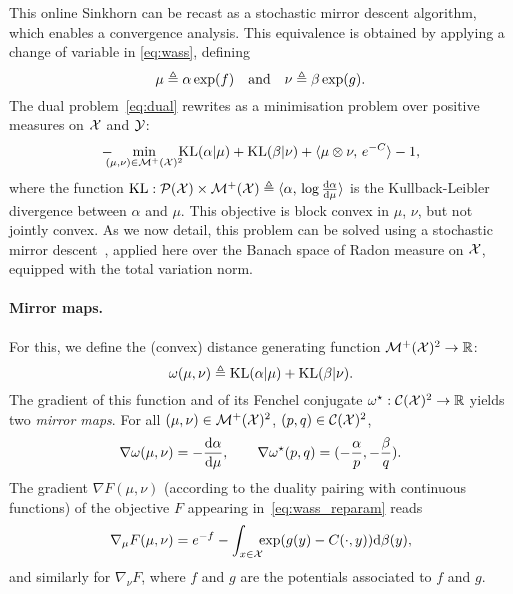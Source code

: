 This online Sinkhorn can be recast as a stochastic mirror descent algorithm, which enables a convergence analysis.
%
This equivalence is obtained by applying a change
of variable in \eqref{eq:wass}, defining 
\begin{equation}\label{eq-change-var}
	\mu \triangleq \alpha \exp(f)
	\quad \text{and} \quad 
	\nu \triangleq \beta \exp(g). 
\end{equation}
The dual problem~\eqref{eq:dual} 
rewrites as a minimisation problem over positive measures on $\mathcal{X}$ and $\mathcal{Y}$:
\begin{equation}\label{eq:wass_reparam}
    - \!\!\!\!\min_{(\mu,\nu) \in \mathcal{M}^+(\mathcal{X})^2} \!\!\!\textrm{KL}(\alpha | \mu)
    + \textrm{KL}(\beta | \nu) + \langle \mu \otimes \nu,\,e^{-C}\rangle - 1,
\end{equation}
where the function $\textrm{KL}: \mathcal{P}(\mathcal{X}) \times \mathcal{M}^+(\mathcal{X}) \triangleq \langle \alpha,\, \log \frac{\textrm{d} \alpha}{\textrm{d} \mu}\rangle$ is the Kullback-Leibler divergence between
$\alpha$ and $\mu$. 
%
This objective is block convex in $\mu$, $\nu$, but not jointly convex. 
%
As we now detail, this problem can be solved using a stochastic mirror descent~\cite{beck2003mirror}, applied here over the Banach space of Radon measure on $\mathcal{X}$, equipped with the total variation norm. 

\paragraph{Mirror maps.}

For this, we define the (convex) distance generating function $\mathcal{M}^+(\mathcal{X})^2 \to \mathbb{R}$:
\begin{equation}
    \omega(\mu, \nu) \triangleq \textrm{KL}(\alpha | \mu) + \textrm{KL}(\beta | \nu).
\end{equation}
The gradient of this function and of its Fenchel conjugate $\omega^\star: \mathcal{C}(\mathcal{X})^2 \to \mathbb{R}$ yields two \textit{mirror maps}. For all $(\mu, \nu) \in
\mathcal{M}^+(\mathcal{X})^2$, $(p, q) \in \mathcal{C}(\mathcal{X})^2$,  
\begin{equation}
    \nabla \omega(\mu, \nu) = - \frac{\textrm{d} \alpha}{\textrm{d} \mu}, 
    \qquad \nabla \omega^\star(p, q) = (-\frac{\alpha}{p}, -\frac{\beta}{q}).
\end{equation}
The gradient $\nabla F(\mu, \nu)$ (according to the duality pairing with continuous functions) of the objective $F$ appearing in~\eqref{eq:wass_reparam} reads
\begin{equation}
    \nabla_\mu F(\mu, \nu) = e^{-f} - 
    \int_{x \in \mathcal{X}} \!\!\! \exp(g(y) - C(\cdot, y))\textrm{d} \beta(y),
\end{equation}
and similarly for $\nabla_\nu F$, where  $f$ and $g$ are the potentials associated
to $f$ and $g$. 

